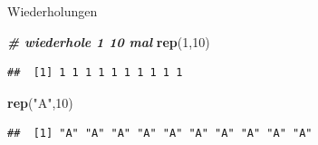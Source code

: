 \documentclass[
  ignorenonframetext,
]{beamer}
\newenvironment{Shaded}{\begin{snugshade}}{\end{snugshade}}
\newcommand{\CommentTok}[1]{\textcolor[rgb]{0.00,0.40,1.00}{\textbf{\textit{#1}}}}
\newcommand{\DecValTok}[1]{\textcolor[rgb]{0.27,0.67,0.26}{#1}}
\newcommand{\KeywordTok}[1]{\textcolor[rgb]{0.26,0.66,0.93}{\textbf{#1}}}
\newcommand{\NormalTok}[1]{\textcolor[rgb]{0.74,0.68,0.62}{#1}}
\newcommand{\StringTok}[1]{\textcolor[rgb]{0.02,0.61,0.04}{#1}}
\begin{document}
\begin{frame}[fragile]{Wiederholungen}
\protect\hypertarget{wiederholungen}{}

\begin{Shaded}
\begin{Highlighting}[]
\CommentTok{# wiederhole 1 10 mal}
\KeywordTok{rep}\NormalTok{(}\DecValTok{1}\NormalTok{,}\DecValTok{10}\NormalTok{)}
\end{Highlighting}
\end{Shaded}

\begin{verbatim}
##  [1] 1 1 1 1 1 1 1 1 1 1
\end{verbatim}

\begin{Shaded}
\begin{Highlighting}[]
\KeywordTok{rep}\NormalTok{(}\StringTok{"A"}\NormalTok{,}\DecValTok{10}\NormalTok{)}
\end{Highlighting}
\end{Shaded}

\begin{verbatim}
##  [1] "A" "A" "A" "A" "A" "A" "A" "A" "A" "A"
\end{verbatim}

\end{frame}
\end{document}
